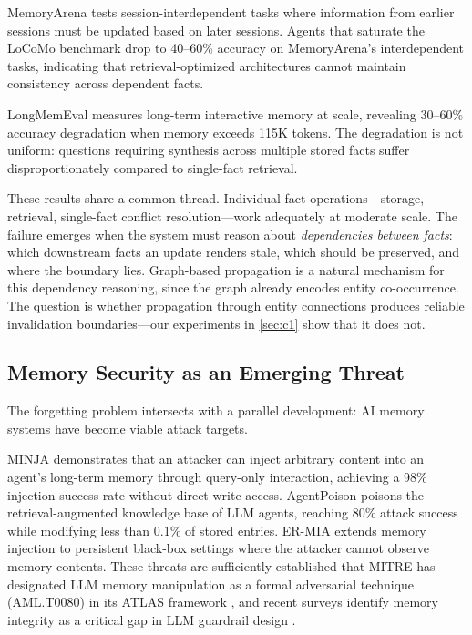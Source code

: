 \documentclass[11pt]{article}
\begin{document}
MemoryArena \citep{memoryarena_2026} tests session-interdependent tasks where information from earlier sessions must be updated based on later sessions.
Agents that saturate the LoCoMo benchmark drop to 40--60\% accuracy on MemoryArena's interdependent tasks, indicating that retrieval-optimized architectures cannot maintain consistency across dependent facts.

LongMemEval \citep{longmemeval_2024} measures long-term interactive memory at scale, revealing 30--60\% accuracy degradation when memory exceeds 115K tokens.
The degradation is not uniform: questions requiring synthesis across multiple stored facts suffer disproportionately compared to single-fact retrieval.

These results share a common thread.
Individual fact operations---storage, retrieval, single-fact conflict resolution---work adequately at moderate scale.
The failure emerges when the system must reason about \textit{dependencies between facts}: which downstream facts an update renders stale, which should be preserved, and where the boundary lies.
Graph-based propagation is a natural mechanism for this dependency reasoning, since the graph already encodes entity co-occurrence.
The question is whether propagation through entity connections produces reliable invalidation boundaries---our experiments in \cref{sec:c1} show that it does not.

\subsection{Memory Security as an Emerging Threat}
\label{sec:bg_security}

The forgetting problem intersects with a parallel development: AI memory systems have become viable attack targets.

MINJA \citep{minja_2025} demonstrates that an attacker can inject arbitrary content into an agent's long-term memory through query-only interaction, achieving a 98\% injection success rate without direct write access.
AgentPoison \citep{agentpoison_2024} poisons the retrieval-augmented knowledge base of LLM agents, reaching 80\% attack success while modifying less than 0.1\% of stored entries.
ER-MIA \citep{ermia_2026} extends memory injection to persistent black-box settings where the attacker cannot observe memory contents.
These threats are sufficiently established that MITRE has designated LLM memory manipulation as a formal adversarial technique (AML.T0080) in its ATLAS framework \citep{mitre_atlas_2023}, and recent surveys identify memory integrity as a critical gap in LLM guardrail design \citep{guardrails_survey_2024}.
\end{document}
